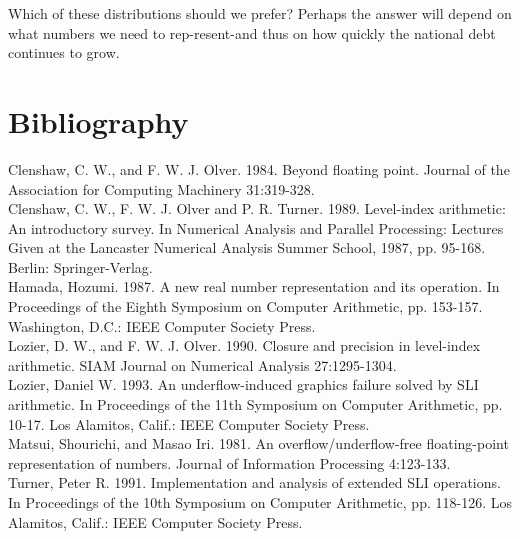 \documentclass[10pt]{article}
\begin{document}
Which of these distributions should we prefer? Perhaps the answer will depend on what numbers we need to rep-resent-and thus on how quickly the national debt continues to grow.

\section*{Bibliography}
Clenshaw, C. W., and F. W. J. Olver. 1984. Beyond floating point. Journal of the Association for Computing Machinery 31:319-328.\\
Clenshaw, C. W., F. W. J. Olver and P. R. Turner. 1989. Level-index arithmetic: An introductory survey. In Numerical Analysis and Parallel Processing: Lectures Given at the Lancaster Numerical Analysis Summer School, 1987, pp. 95-168. Berlin: Springer-Verlag.\\
Hamada, Hozumi. 1987. A new real number representation and its operation. In Proceedings of the Eighth Symposium on Computer Arithmetic, pp. 153-157. Washington, D.C.: IEEE Computer Society Press.\\
Lozier, D. W., and F. W. J. Olver. 1990. Closure and precision in level-index arithmetic. SIAM Journal on Numerical Analysis 27:1295-1304.\\
Lozier, Daniel W. 1993. An underflow-induced graphics failure solved by SLI arithmetic. In Proceedings of the 11th Symposium on Computer Arithmetic, pp. 10-17. Los Alamitos, Calif.: IEEE Computer Society Press.\\
Matsui, Shourichi, and Masao Iri. 1981. An overflow/underflow-free floating-point representation of numbers. Journal of Information Processing 4:123-133.\\
Turner, Peter R. 1991. Implementation and analysis of extended SLI operations. In Proceedings of the 10th Symposium on Computer Arithmetic, pp. 118-126. Los Alamitos, Calif.: IEEE Computer Society Press.
\end{document}
